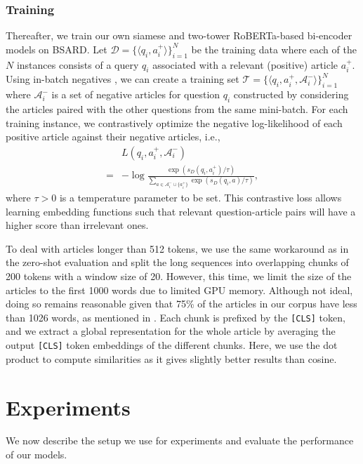 \documentclass[11pt]{article}
\begin{document}
\subsubsection{Training}
Thereafter, we train our own siamese and two-tower RoBERTa-based bi-encoder models on BSARD. Let $\mathcal{D}=\{\langle q_{i}, a_{i}^{+}\rangle\}_{i=1}^{N}$ be the training data where each of the $N$ instances consists of a query $q_{i}$ associated with a relevant (positive) article $a_{i}^{+}$. Using in-batch negatives \citep{chen2017sampling, henderson2017efficient}, we can create a training set $\mathcal{T}=\{\langle q_{i}, a_{i}^{+}, \mathcal{A}_{i}^{-}\rangle\}_{i=1}^{N}$ where $\mathcal{A}_{i}^{-}$ is a set of negative articles for question $q_i$ constructed by considering the articles paired with the other questions from the same mini-batch. For each training instance, we contrastively optimize the negative log-likelihood of each positive article against their negative articles, i.e.,
\begin{equation}
\begin{aligned}
&L\left(q_{i}, a_{i}^{+}, \mathcal{A}_{i}^{-}\right) \\
=&-\log \frac{\operatorname{exp}\left(s_D(q_i,a_{i}^{+})/\tau\right)}
{\sum_{a \in \mathcal{A}_{i}^{-} \cup \{a_{i}^{+}\}} \operatorname{exp}\left(s_D(q_{i}, a)/\tau\right)},
\end{aligned}
\end{equation}
where $\tau > 0$ is a temperature parameter to be set. This contrastive loss allows learning embedding functions such that relevant question-article pairs will have a higher score than irrelevant ones.

To deal with articles longer than 512 tokens, we use the same workaround as in the zero-shot evaluation and split the long sequences into overlapping chunks of 200 tokens with a window size of 20. However, this time, we limit the size of the articles to the first 1000 words due to limited GPU memory. Although not ideal, doing so remains reasonable given that 75\% of the articles in our corpus have less than 1026 words, as mentioned in . Each chunk is prefixed by the \texttt{[CLS]} token, and we extract a global representation for the whole article by averaging the output \texttt{[CLS]} token embeddings of the different chunks. Here, we use the dot product to compute similarities as it gives slightly better results than cosine.



\section{Experiments \label{sec:experiments}}
We now describe the setup we use for experiments and evaluate the performance of our models.
\end{document}
